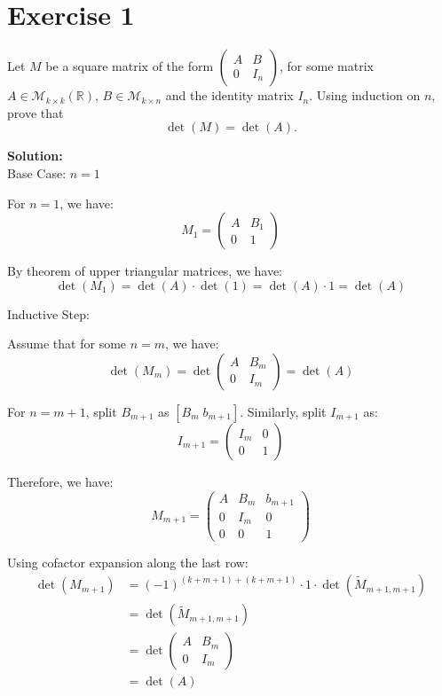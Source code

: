 \documentclass{article}
\begin{document}
\section*{Exercise 1}
Let $M$ be a square matrix of the form $\begin{pmatrix} A & B \\ 0 & I_n \end{pmatrix}$, for some matrix $A \in \mathcal{M}_{k\times k}(\mathbb{R})$, $B \in \mathcal{M}_{k\times n}$ and the identity matrix $I_n$. Using induction on $n$, prove that
\[\det(M) = \det(A).\]

\textbf{Solution:} \\

Base Case: $n = 1$

For $n = 1$, we have:
$$M_1 = \begin{pmatrix} A & B_1 \\ 0 & 1 \end{pmatrix}$$

By theorem of upper triangular matrices, we have:
$$\det(M_1) = \det(A) \cdot \det(1) = \det(A) \cdot 1 = \det(A)$$

Inductive Step:

Assume that for some $n = m$, we have:
$$\det(M_m) = \det\begin{pmatrix} A & B_m \\ 0 & I_m \end{pmatrix} = \det(A)$$

For $n = m+1$, split $B_{m+1}$ as $[B_m \; b_{m+1}]$. Similarly, split $I_{m+1}$ as:
$$I_{m+1} = \begin{pmatrix} I_m & 0 \\ 0 & 1 \end{pmatrix}$$

Therefore, we have:
$$M_{m+1} = \begin{pmatrix} A & B_m & b_{m+1} \\ 0 & I_m & 0 \\ 0 & 0 & 1 \end{pmatrix}$$

Using cofactor expansion along the last row:
\begin{align*}
\det(M_{m+1}) &= (-1)^{(k+m+1)+(k+m+1)} \cdot 1 \cdot \det(\tilde{M}_{m+1, m+1}) \\
&= \det(\tilde{M}_{m+1, m+1}) \\
&= \det\begin{pmatrix} A & B_m \\ 0 & I_m \end{pmatrix} \\
&= \det(A)
\end{align*}
\end{document}
